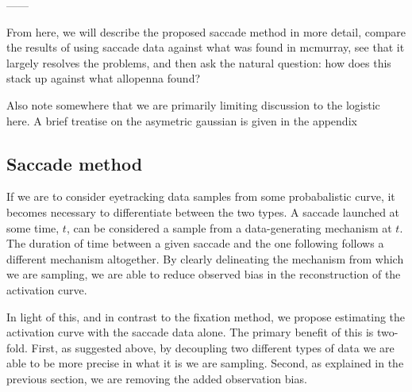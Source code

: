 \documentclass{article}
\begin{document}


------

From here, we will describe the proposed saccade method in more detail, compare the results of using saccade data against what was found in mcmurray, see that it largely resolves the problems, and then ask the natural question: how does this stack up against what allopenna found?

Also note somewhere that we are primarily limiting discussion to the logistic here. A brief treatise on the asymetric gaussian is given in the appendix


\subsection{Saccade method}

If we are to consider eyetracking data samples from some probabalistic curve, it becomes necessary to differentiate between the two types. A saccade launched at some time, $t$, can be considered a sample from a data-generating mechanism at $t$. The duration of time between a given saccade and the one following follows a different mechanism altogether. By clearly delineating the mechanism from which we are sampling, we are able to reduce observed bias in the reconstruction of the activation curve.

In light of this, and in contrast to the fixation method, we propose estimating the activation curve with the saccade data alone. The primary benefit of this is two-fold. First, as suggested above, by decoupling two different types of data we are able to be more precise in what it is we are sampling. Second, as explained in the previous section, we are removing the added observation bias. 
\end{document}
